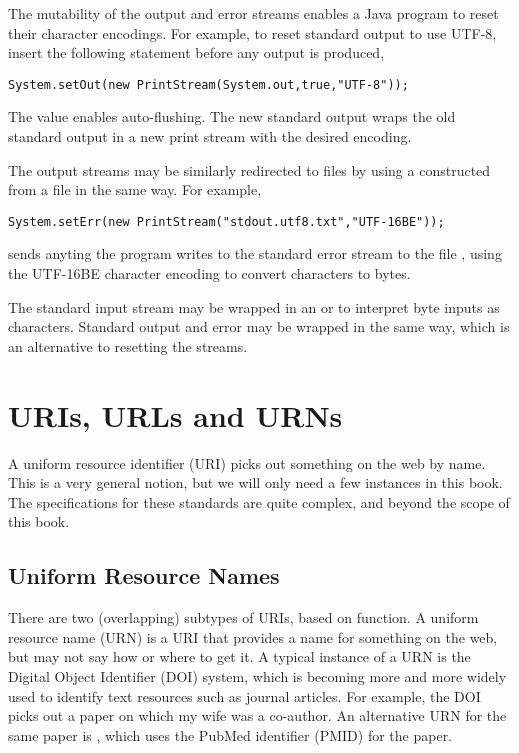 The mutability of the output and error streams enables a Java program
to reset their character encodings.  For example, to reset standard
output to use UTF-8, insert the following statement before any
output is produced,
%
\begin{verbatim}
System.setOut(new PrintStream(System.out,true,"UTF-8"));
\end{verbatim}
%
The value  enables auto-flushing.  The new standard
output wraps the old standard output in a new print stream
with the desired encoding. 

The output streams may be similarly redirected to files by using a
 constructed from a file in the same way.  For
example,
%
\begin{verbatim}
System.setErr(new PrintStream("stdout.utf8.txt","UTF-16BE"));
\end{verbatim}
%
sends anyting the program writes to the standard error stream to the
file , using the UTF-16BE character encoding
to convert characters to bytes.

The standard input stream may be wrapped in an
 or  to interpret byte
inputs as characters.  Standard output and error may be wrapped in the
same way, which is an alternative to resetting the streams.



\section{URIs, URLs and URNs}\label{section:uri-url-urn}

A uniform resource identifier (URI) picks out something on the web by
name.  This is a very general notion, but we will only need a few
instances in this book.  The specifications for these standards are
quite complex, and beyond the scope of this book.  

\subsection{Uniform Resource Names}

There are two (overlapping) subtypes of URIs, based on function.  A
uniform resource name (URN) is a URI that provides a name for
something on the web, but may not say how or where to get it.  A
typical instance of a URN is the Digital Object Identifier (DOI)
system, which is becoming more and more widely used to identify text
resources such as journal articles.  For example, the DOI
 picks out a paper on which my
wife was a co-author.  An alternative URN for the same paper is
, which uses the PubMed identifier (PMID) for the
paper.

